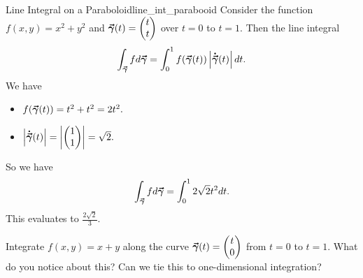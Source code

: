                        \begin{ex}{Line Integral on a Paraboloid}{line_int_parabooid}
                       Consider the function $f(x,y)=x^2+y^2$ and $\boldsymbol{\vec{\gamma}}(t)=\begin{pmatrix} t \\ t \end{pmatrix}$ over $t=0$ to $t=1$.  Then the line integral
                       \[
                       \int_{\boldsymbol{\vec{\gamma}}} fd\boldsymbol{\vec{\gamma}} = \int_0^1 f(\boldsymbol{\vec{\gamma}}(t))\left|\boldsymbol{\dot{\vec{\gamma}}}(t)\right|dt.
                       \]
                       We have
                       \begin{itemize}
                           \item $f(\boldsymbol{\vec{\gamma}}(t))=t^2+t^2=2t^2.$
                           \item $\left|\boldsymbol{\dot{\vec{\gamma}}}(t)\right|=\left|\begin{pmatrix} 1 \\ 1\end{pmatrix}\right|=\sqrt{2}.$
                       \end{itemize}
                       So we have
                       \[
                       \int_{\boldsymbol{\vec{\gamma}}} fd\boldsymbol{\vec{\gamma}} = \int_0^1 2\sqrt{2}t^2dt.
                       \]
                       This evaluates to $\frac{2\sqrt{2}}{3}$.
                       \end{ex}
                       
                       \begin{exercise}
                       Integrate $f(x,y)=x+y$ along the curve $\boldsymbol{\vec{\gamma}}(t)=\begin{pmatrix} t \\ 0 \end{pmatrix}$ from $t=0$ to $t=1$. What do you notice about this? Can we tie this to one-dimensional integration?
                       \end{exercise}
                       
                      
                       
        
        

